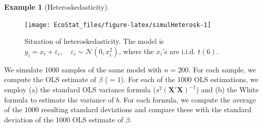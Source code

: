 \documentclass[
  12pt,
]{book}
\theoremstyle{definition}
\theoremstyle{definition}
\newtheorem{example}{Example}[chapter]
\theoremstyle{definition}
\theoremstyle{definition}
\theoremstyle{remark}
\begin{document}
\begin{example}[Heteroskedasticity]
\begin{figure}
\texttt{[image: EcoStat\_files/figure-latex/simulHeterosk-1]} \caption{Situation of heteroskedasticity. The model is $y_i = x_i + \varepsilon_i, \quad \varepsilon_i \sim \mathcal{N}(0,x_i^2)$, where the $x_i$'s are i.i.d. $t(6)$.}\label{fig:simulHeterosk}
\end{figure}

We simulate 1000 samples of the same model with \(n=200\). For each sample, we compute the OLS estimate of \(\beta\) (\(=1\)). For each of the 1000 OLS estimations, we employ (a) the standard OLS variance formula (\(s^2 (\mathbf{X}'\mathbf{X})^{-1}\)) and (b) the White formula to estimate the variance of \(b\). For each formula, we compute the average of the 1000 resulting standard deviations and compare these with the standard deviation of the 1000 OLS estimate of \(\beta\).


\end{example}
\end{document}
